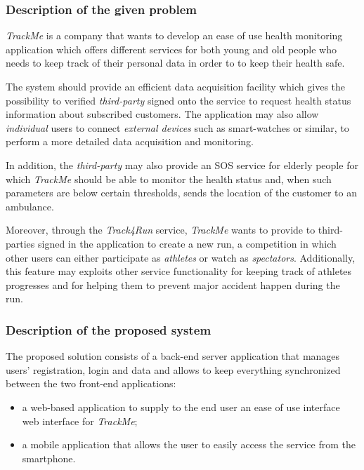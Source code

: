 \documentclass[a4paper]{article}
\begin{document}
        \subsubsection{Description of the given problem}
        \textit{TrackMe} is a company that wants to develop an ease of use health monitoring application which offers different services for both young and old people who needs to keep track of their personal data in order to to keep their health safe.
        
        The system should provide an efficient data acquisition facility which gives the possibility to verified \textit{third-party} signed onto the service to request health status information about subscribed customers. The application may also allow \textit{individual} users to connect \textit{external devices} such as smart-watches or similar, to perform a more detailed data acquisition and monitoring.
        
        In addition, the \textit{third-party} may also provide an SOS service for elderly people for which \textit{TrackMe} should be able to monitor the health status and, when such parameters are below certain thresholds, sends the location of the customer to an ambulance.
    
        Moreover, through the \textit{Track4Run} service, \textit{TrackMe} wants to provide to third-parties signed in the application to create a new run, a competition in which other users can either participate as \textit{athletes} or watch as \textit{spectators}. Additionally, this feature may exploits other service functionality for keeping track of athletes progresses and for helping them to prevent major accident happen during the run.
                
        \subsubsection{Description of the proposed system}
        The proposed solution consists of a back-end server application that manages users' registration, login and data and allows to keep everything synchronized between the two front-end applications:
        \begin{itemize}
            \item a web-based application to supply to the end user an ease of use interface web interface for \textit{TrackMe};
            \item a mobile application that allows the user to easily access the service from the smartphone.
        \end{itemize}
        
\end{document}
